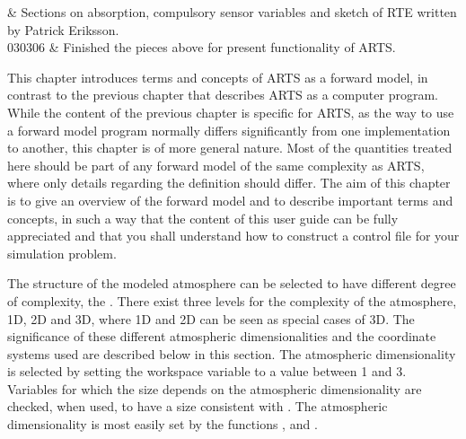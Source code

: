  \label{sec:fm_defs}


 & Sections on absorption, compulsory sensor variables and sketch 
           of RTE written by Patrick Eriksson.\\
  030306 & Finished the pieces above for present functionality of ARTS. \\
\stophistory




This chapter introduces terms and concepts of ARTS as a forward model,
in contrast to the previous chapter that describes ARTS as a computer
program. While the content of the previous chapter is specific for
ARTS, as the way to use a forward model program normally differs
significantly from one implementation to another, this chapter is of
more general nature. Most of the quantities treated here should be
part of any forward model of the same complexity as ARTS, where only
details regarding the definition should differ. The aim of this
chapter is to give an overview of the forward model and to describe
important terms and concepts, in such a way that the content of this user
guide can be fully appreciated and that you shall understand how to
construct a control file for your simulation problem.




\label{sec:fm_defs:atmosphere}


\label{sec:fm_defs:atmdim}

The structure of the modeled atmosphere can be selected to have
different degree of complexity, the . There exist three levels for the complexity of the
atmosphere, 1D, 2D and 3D, where 1D and 2D can be seen as special
cases of 3D. The significance of these different atmospheric
dimensionalities and the coordinate systems used are described below
in this section. The atmospheric dimensionality is selected by setting
the workspace variable  to a value between 1
and 3. Variables for which the size depends on the atmospheric
dimensionality are checked, when used, to have a size consistent with
. The atmospheric dimensionality is most
easily set by the functions ,
 and .

